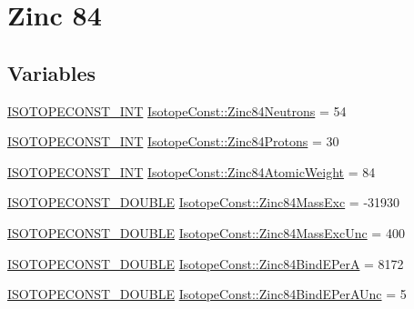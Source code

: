 \hypertarget{group___isotope_const-_zinc-_zn84}{}\section{Zinc 84}
\label{group___isotope_const-_zinc-_zn84}
\subsection*{Variables}
\begin{DoxyCompactItemize}
\item 
\mbox{\hyperlink{group___isotope_const-_macros_ga5f18360b3e99483a35c32d789e62621c}{I\+S\+O\+T\+O\+P\+E\+C\+O\+N\+S\+T\+\_\+\+I\+NT}} \mbox{\hyperlink{group___isotope_const-_zinc-_zn84_ga0c86aaff20c04f37adf5a5ee9350a7f7}{Isotope\+Const\+::\+Zinc84\+Neutrons}} = 54
\item 
\mbox{\hyperlink{group___isotope_const-_macros_ga5f18360b3e99483a35c32d789e62621c}{I\+S\+O\+T\+O\+P\+E\+C\+O\+N\+S\+T\+\_\+\+I\+NT}} \mbox{\hyperlink{group___isotope_const-_zinc-_zn84_ga2431446972039726c6bc023f29f36516}{Isotope\+Const\+::\+Zinc84\+Protons}} = 30
\item 
\mbox{\hyperlink{group___isotope_const-_macros_ga5f18360b3e99483a35c32d789e62621c}{I\+S\+O\+T\+O\+P\+E\+C\+O\+N\+S\+T\+\_\+\+I\+NT}} \mbox{\hyperlink{group___isotope_const-_zinc-_zn84_ga50ba764f7441e19d9167345bc33c5694}{Isotope\+Const\+::\+Zinc84\+Atomic\+Weight}} = 84
\item 
\mbox{\hyperlink{group___isotope_const-_macros_ga8f45a7272ce02c0b4c65c44636ed719a}{I\+S\+O\+T\+O\+P\+E\+C\+O\+N\+S\+T\+\_\+\+D\+O\+U\+B\+LE}} \mbox{\hyperlink{group___isotope_const-_zinc-_zn84_ga0dad5a37765b7dc679f9237e65b94316}{Isotope\+Const\+::\+Zinc84\+Mass\+Exc}} = -\/31930
\item 
\mbox{\hyperlink{group___isotope_const-_macros_ga8f45a7272ce02c0b4c65c44636ed719a}{I\+S\+O\+T\+O\+P\+E\+C\+O\+N\+S\+T\+\_\+\+D\+O\+U\+B\+LE}} \mbox{\hyperlink{group___isotope_const-_zinc-_zn84_ga2594ca3e561b26b1667634a8b5734300}{Isotope\+Const\+::\+Zinc84\+Mass\+Exc\+Unc}} = 400
\item 
\mbox{\hyperlink{group___isotope_const-_macros_ga8f45a7272ce02c0b4c65c44636ed719a}{I\+S\+O\+T\+O\+P\+E\+C\+O\+N\+S\+T\+\_\+\+D\+O\+U\+B\+LE}} \mbox{\hyperlink{group___isotope_const-_zinc-_zn84_gaa2ee9a73d569aa0629b85d0aa25da0e7}{Isotope\+Const\+::\+Zinc84\+Bind\+E\+PerA}} = 8172
\item 
\mbox{\hyperlink{group___isotope_const-_macros_ga8f45a7272ce02c0b4c65c44636ed719a}{I\+S\+O\+T\+O\+P\+E\+C\+O\+N\+S\+T\+\_\+\+D\+O\+U\+B\+LE}} \mbox{\hyperlink{group___isotope_const-_zinc-_zn84_gadef99e19e1e53b66372ccf7ea3d5a0bf}{Isotope\+Const\+::\+Zinc84\+Bind\+E\+Per\+A\+Unc}} = 5

\end{DoxyCompactItemize}
